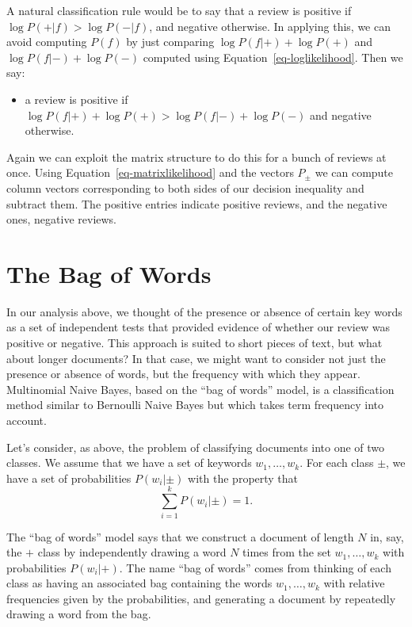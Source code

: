 \documentclass[
  11pt,
  letterpaper,
]{scrbook}
\providecommand{\tightlist}{%
  \setlength{\itemsep}{0pt}\setlength{\parskip}{0pt}}\usepackage{longtable,booktabs,array}
\theoremstyle{plain}
\theoremstyle{plain}
\theoremstyle{remark}
\begin{document}
A natural classification rule would be to say that a review is positive
if \(\log P(+|f)>\log P(-|f)\), and negative otherwise. In applying
this, we can avoid computing \(P(f)\) by just comparing
\(\log P(f|+)+\log P(+)\) and \(\log P(f|-)+\log P(-)\) computed using
Equation~\ref{eq-loglikelihood}. Then we say:

\begin{itemize}
\tightlist
\item
  a review is positive if
  \(\log P(f|+)+\log P(+)>\log P(f|-)+\log P(-)\) and negative
  otherwise.
\end{itemize}

Again we can exploit the matrix structure to do this for a bunch of
reviews at once. Using Equation~\ref{eq-matrixlikelihood} and the
vectors \(P_{\pm}\) we can compute column vectors corresponding to both
sides of our decision inequality and subtract them. The positive entries
indicate positive reviews, and the negative ones, negative reviews.

\hypertarget{the-bag-of-words}{%
\section{The Bag of Words}\label{the-bag-of-words}}

In our analysis above, we thought of the presence or absence of certain
key words as a set of independent tests that provided evidence of
whether our review was positive or negative. This approach is suited to
short pieces of text, but what about longer documents? In that case, we
might want to consider not just the presence or absence of words, but
the frequency with which they appear. Multinomial Naive Bayes, based on
the ``bag of words'' model, is a classification method similar to
Bernoulli Naive Bayes but which takes term frequency into account.

Let's consider, as above, the problem of classifying documents into one
of two classes. We assume that we have a set of keywords
\(w_1,\ldots, w_k\). For each class \(\pm\), we have a set of
probabilities \(P(w_i|\pm)\) with the property that \[
\sum_{i=1}^{k}P(w_{i}|\pm)=1.
\]

The ``bag of words'' model says that we construct a document of length
\(N\) in, say, the \(+\) class by independently drawing a word \(N\)
times from the set \(w_1,\ldots, w_k\) with probabilities
\(P(w_{i}|+)\). The name ``bag of words'' comes from thinking of each
class as having an associated bag containing the words
\(w_1,\ldots, w_k\) with relative frequencies given by the
probabilities, and generating a document by repeatedly drawing a word
from the bag.
\end{document}
